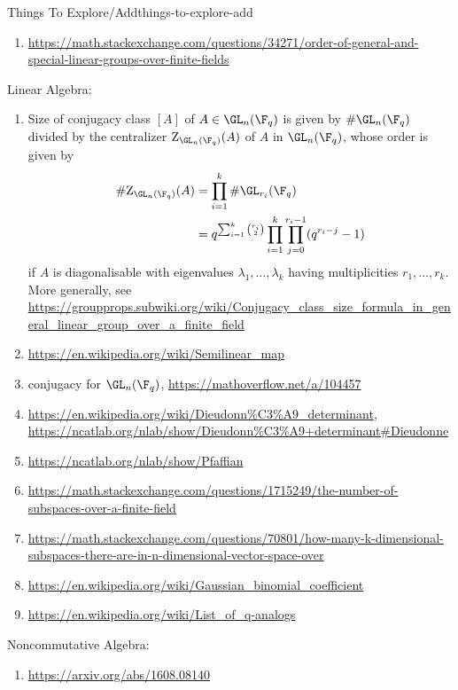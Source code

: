 \begin{remark}{Things To Explore/Add}{things-to-explore-add}
\begin{enumerate}
\begin{enumerate}
            \end{enumerate}
        \item \url{https://math.stackexchange.com/questions/34271/order-of-general-and-special-linear-groups-over-finite-fields}
    \end{enumerate}
    Linear Algebra:
    \begin{enumerate}
        \item Size of conjugacy class $[A]$ of $A\in\GL_{n}(\F_{q})$ is given by $\#\GL_{n}(\F_{q})$ divided by the centralizer $\mathrm{Z}_{\GL_{n}(\F_{q})}(A)$ of $A$ in $\GL_{n}(\F_{q})$, whose order is given by
            \begin{align*}
                \#\mathrm{Z}_{\GL_{n}(\F_{q})}(A) &= \prod^{k}_{i=1}\#\GL_{r_{i}}(\F_{q})\\%
                                                  &= q^{\sum^{k}_{i=1}\binom{r_{i}}{2}}\prod^{k}_{i=1}\prod^{r_{i}-1}_{j=0}(q^{r_{i}-j}-1)%
            \end{align*}
            if $A$ is diagonalisable with eigenvalues $\lambda_{1},\ldots,\lambda_{k}$ having multiplicities $r_{1},\ldots,r_{k}$. More generally, see \url{https://groupprops.subwiki.org/wiki/Conjugacy_class_size_formula_in_general_linear_group_over_a_finite_field}
        \item \url{https://en.wikipedia.org/wiki/Semilinear\_map}
        \item conjugacy for $\GL_{n}(\F_{q})$, \url{https://mathoverflow.net/a/104457}
        \item \url{https://en.wikipedia.org/wiki/Dieudonn\%C3\%A9_determinant}, \url{https://ncatlab.org/nlab/show/Dieudonn\%C3\%A9+determinant\#Dieudonne}
        \item \url{https://ncatlab.org/nlab/show/Pfaffian}
        \item \url{https://math.stackexchange.com/questions/1715249/the-number-of-subspaces-over-a-finite-field}
        \item \url{https://math.stackexchange.com/questions/70801/how-many-k-dimensional-subspaces-there-are-in-n-dimensional-vector-space-over}
        \item \url{https://en.wikipedia.org/wiki/Gaussian_binomial_coefficient}
        \item \url{https://en.wikipedia.org/wiki/List_of_q-analogs}
    \end{enumerate}
    Noncommutative Algebra:
    \begin{enumerate}
        \item \url{https://arxiv.org/abs/1608.08140}

\end{enumerate}
\end{remark}
